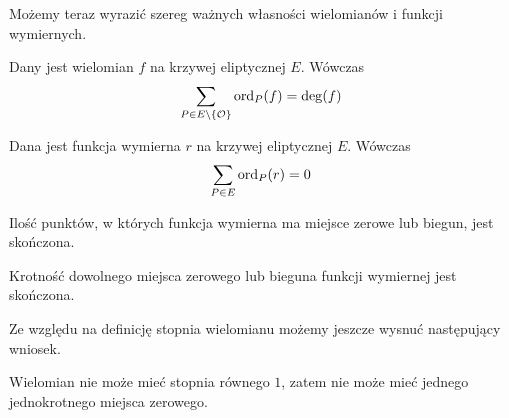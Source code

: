 Możemy teraz wyrazić szereg ważnych własności
wielomianów i funkcji wymiernych.

\begin{theorem}\label{polynomial_ord_deg_theorem}
Dany jest wielomian $f$ na krzywej eliptycznej $E$.
Wówczas
\begin{equation*}
\sum_{P \in E\setminus \{\mathcal{O}\}} \operatorname{ord}_P(f) = \deg(f)
\end{equation*}
\end{theorem}

\begin{corollary}\label{function_order_sum_zero_corollary}
Dana jest funkcja wymierna $r$ na krzywej eliptycznej $E$. Wówczas
\begin{equation*}
\sum_{P \in E} \operatorname{ord}_P(r) = 0
\end{equation*}
\end{corollary}

\begin{corollary}
Ilość punktów, w których funkcja wymierna ma miejsce zerowe lub biegun,
jest skończona.
\end{corollary}

\begin{corollary}
Krotność dowolnego miejsca zerowego lub bieguna funkcji wymiernej
jest skończona.
\end{corollary}

Ze względu na definicję stopnia wielomianu
możemy jeszcze wysnuć następujący wniosek.

\begin{corollary}\label{poly_no_single_zero_corollary}
Wielomian nie może mieć stopnia równego $1$,
zatem nie może mieć jednego jednokrotnego miejsca zerowego.
\end{corollary}
